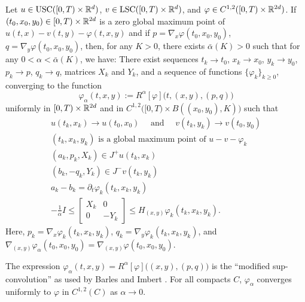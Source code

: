\begin{lemma}
\label{lemma: Parabolic, nonlocal Jensen-Ishii Lemma}
    Let $u \in \USC([0,T) \times \R^d)$, $v \in \LSC([0,T) \times \R^d)$, and $\varphi \in C^{1,2}([0,T) \times \R^{2d})$. If $(t_0,x_0,y_0) \in [0,T) \times \R^{2d}$ is a zero global maximum point of $u(t,x) - v(t,y) - \varphi(t,x,y)$ and if $p = \nabla_x \varphi(t_0,x_0,y_0)$, $q = \nabla_y \varphi(t_0,x_0,y_0)$, then, for any $K>0$, there exists $\bar \alpha (K) > 0$ such that for any $0 <\alpha < \bar \alpha (K)$, we have: There exist sequences $t_k \rightarrow t_0$, $x_k \rightarrow x_0$, $y_k \rightarrow y_0$, $p_k \rightarrow p$, $q_k \rightarrow q$, matrices $X_k$ and $Y_k$, and a sequence of functions $\{\varphi_k\}_{k \geq 0}$, converging to the function 
    \begin{equation*}
        \varphi_\alpha (t,x,y) := R^\alpha [\varphi] \big(t,(x,y),(p,q)\big)
    \end{equation*}
    uniformly in $[0,T) \times \R^{2d}$ and in $C^{1,2}\big([0,T) \times B((x_0,y_0),K)\big)$ such that 
    \begin{align}
        u(t_k,x_k) \rightarrow u(t_0,x_0) \quad \text{ and } \quad v(t_k,y_k) \rightarrow v(t_0,y_0) \label{eqn: (36) in Seydel} \\
        (t_k,x_k,y_k) \text{ is a global maximum point of } u-v-\varphi_k \label{eqn: (37) in Seydel} \\
        (a_k,p_k,X_k) \in J^+ u(t_k,x_k) \label{eqn: (38) in Seydel} \\
        (b_k,-q_k,Y_k) \in J^- v(t_k,y_k) \label{eqn: (39) in Seydel} \\
        a_k - b_k = \partial_t \varphi_k(t_k,x_k,y_k) \label{eqn: (39*) in Seydel} \\
        - \frac{1}{\alpha} I \leq 
            \begin{bmatrix}
            X_k & 0 \\
            0 & -Y_k 
            \end{bmatrix}
            \leq H_{(x,y)} \varphi_k (t_k,x_k,y_k). \label{eqn: (40) in Seydel}
    \end{align}
    Here, $p_k = \nabla_x \varphi_k(t_k,x_k,y_k)$, $q_k = \nabla_y \varphi_k (t_k,x_k,y_k)$, and \newline $\nabla_{(x,y)} \varphi_\alpha (t_0,x_0,y_0) = \nabla_{(x,y)} \varphi(t_0,x_0,y_0)$.
\end{lemma}
\begin{remark}
    The expression $\varphi_\alpha(t,x,y) = R^\alpha[\varphi]\big((x,y),(p,q)\big)$ is the ``modified sup-convolution'' as used by Barles and Imbert \cite{barles2008second}. For all compacts $C$, $\varphi_\alpha$ converges uniformly to $\varphi$ in $C^{1,2}(C)$ as $\alpha \rightarrow 0$.
\end{remark}


